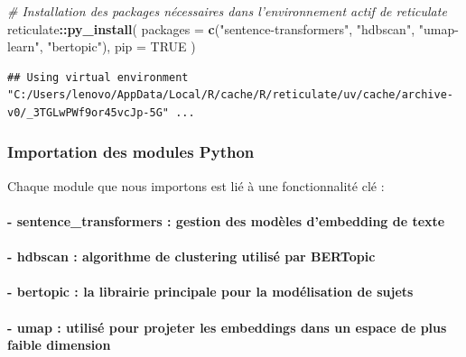 \documentclass[
]{article}
\newenvironment{Shaded}{\begin{snugshade}}{\end{snugshade}}
\newcommand{\AttributeTok}[1]{\textcolor[rgb]{0.13,0.29,0.53}{#1}}
\newcommand{\CommentTok}[1]{\textcolor[rgb]{0.56,0.35,0.01}{\textit{#1}}}
\newcommand{\ConstantTok}[1]{\textcolor[rgb]{0.56,0.35,0.01}{#1}}
\newcommand{\FunctionTok}[1]{\textcolor[rgb]{0.13,0.29,0.53}{\textbf{#1}}}
\newcommand{\NormalTok}[1]{#1}
\newcommand{\SpecialCharTok}[1]{\textcolor[rgb]{0.81,0.36,0.00}{\textbf{#1}}}
\newcommand{\StringTok}[1]{\textcolor[rgb]{0.31,0.60,0.02}{#1}}
\begin{document}
\begin{Shaded}
\begin{Highlighting}[]
\CommentTok{\# Installation des packages nécessaires dans l’environnement actif de reticulate}
\NormalTok{reticulate}\SpecialCharTok{::}\FunctionTok{py\_install}\NormalTok{(}
  \AttributeTok{packages =} \FunctionTok{c}\NormalTok{(}\StringTok{"sentence{-}transformers"}\NormalTok{, }\StringTok{"hdbscan"}\NormalTok{, }\StringTok{"umap{-}learn"}\NormalTok{, }\StringTok{"bertopic"}\NormalTok{),}
  \AttributeTok{pip =} \ConstantTok{TRUE}
\NormalTok{)}
\end{Highlighting}
\end{Shaded}

\begin{verbatim}
## Using virtual environment "C:/Users/lenovo/AppData/Local/R/cache/R/reticulate/uv/cache/archive-v0/_3TGLwPWf9or45vcJp-5G" ...
\end{verbatim}

\subsubsection{Importation des modules
Python}\label{importation-des-modules-python}

Chaque module que nous importons est lié à une fonctionnalité clé :

\paragraph{- sentence\_transformers : gestion des modèles d'embedding de
texte}\label{sentence_transformers-gestion-des-moduxe8les-dembedding-de-texte}

\paragraph{- hdbscan : algorithme de clustering utilisé par
BERTopic}\label{hdbscan-algorithme-de-clustering-utilisuxe9-par-bertopic}

\paragraph{- bertopic : la librairie principale pour la modélisation de
sujets}\label{bertopic-la-librairie-principale-pour-la-moduxe9lisation-de-sujets}

\paragraph{- umap : utilisé pour projeter les embeddings dans un espace
de plus faible
dimension}\label{umap-utilisuxe9-pour-projeter-les-embeddings-dans-un-espace-de-plus-faible-dimension}
\end{document}

